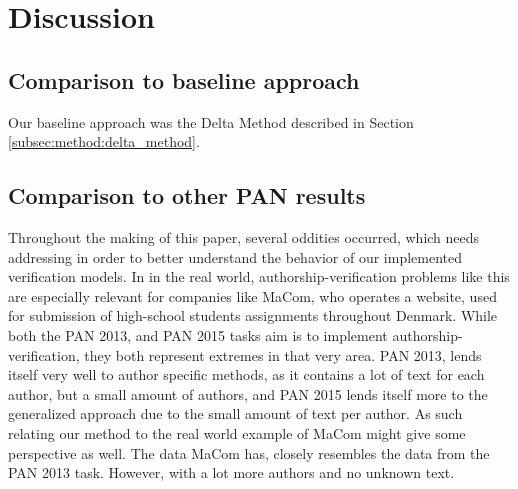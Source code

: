 \section{Discussion} \label{sec:discussion}

\subsection{Comparison to baseline approach}
Our baseline approach was the Delta Method described in Section
\ref{subsec:method:delta_method}.

\subsection{Comparison to other PAN results}

Throughout the making of this paper, several oddities occurred, which needs
addressing in order to better understand the behavior of our implemented
verification models. In in the real world, authorship-verification problems
like this are especially relevant for companies like MaCom, who operates a
website, used for submission of high-school students assignments throughout
Denmark. While both the PAN 2013, and PAN 2015 tasks aim is to implement
authorship-verification, they both represent extremes in that very area. PAN
2013, lends itself very well to author specific methods, as it contains a lot of
text for each author, but a small amount of authors, and PAN 2015 lends itself
more to the generalized approach due to the small amount of text per author. As
such relating our method to the real world example of MaCom might give some
perspective as well. The data MaCom has, closely resembles the data from the PAN
2013 task. However, with a lot more authors and no unknown text.

